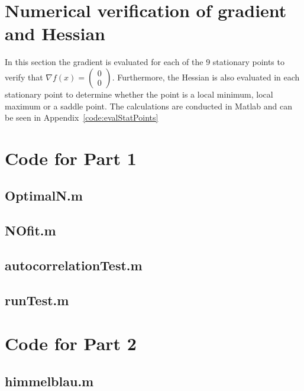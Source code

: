 \section{Numerical verification of gradient and Hessian} \label{app:statPoints}

In this section the gradient is evaluated for each of the 9 stationary points to verify that $\nabla f(x) = \left(\begin{smallmatrix}0\\0\end{smallmatrix}\right)$. Furthermore, the Hessian is also evaluated in each stationary point to determine whether the point is a local minimum, local maximum or a saddle point. The calculations are conducted in Matlab and can be seen in Appendix~\ref{code:evalStatPoints}




\newpage
\section{Code for Part 1} \label{code:part1}
\subsection{OptimalN.m}


\subsection{NOfit.m}


\subsection{autocorrelationTest.m}


\subsection{runTest.m}


\newpage
\section{Code for Part 2} \label{code:part2}

\subsection{himmelblau.m}


